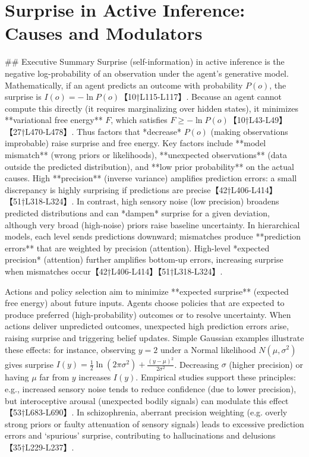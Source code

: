 \documentclass[a4paper]{article}
\title{}
\date{}
\begin{document}
    \maketitle

   
    \section{Surprise in Active Inference: Causes and Modulators }

    ## Executive Summary
    Surprise (self-information) in active inference is the negative log-probability of an observation under the agent’s generative model.  Mathematically, if an agent predicts an outcome with probability \(P(o)\), the surprise is \(I(o) = -\ln P(o)\)【10†L115-L117】.  Because an agent cannot compute this directly (it requires marginalizing over hidden states), it minimizes **variational free energy** \(F\), which satisfies \(F \ge -\ln P(o)\)【10†L43-L49】【27†L470-L478】.  Thus factors that *decrease* \(P(o)\) (making observations improbable) raise surprise and free energy.  Key factors include **model mismatch** (wrong priors or likelihoods), **unexpected observations** (data outside the predicted distribution), and **low prior probability** on the actual causes.  High **precision** (inverse variance) amplifies prediction errors: a small discrepancy is highly surprising if predictions are precise【42†L406-L414】【51†L318-L324】.  In contrast, high sensory noise (low precision) broadens predicted distributions and can *dampen* surprise for a given deviation, although very broad (high-noise) priors raise baseline uncertainty.  In hierarchical models, each level sends predictions downward; mismatches produce **prediction errors** that are weighted by precision (attention).  High-level *expected precision* (attention) further amplifies bottom-up errors, increasing surprise when mismatches occur【42†L406-L414】【51†L318-L324】.
    
    Actions and policy selection aim to minimize **expected surprise** (expected free energy) about future inputs.  Agents choose policies that are expected to produce preferred (high-probability) outcomes or to resolve uncertainty. When actions deliver unpredicted outcomes, unexpected high prediction errors arise, raising surprise and triggering belief updates.  Simple Gaussian examples illustrate these effects: for instance, observing \(y=2\) under a Normal likelihood \(N(\mu,\sigma^2)\) gives surprise \(I(y) = \frac12\ln(2\pi\sigma^2) + \frac{(y-\mu)^2}{2\sigma^2}\).  Decreasing \(\sigma\) (higher precision) or having \(\mu\) far from \(y\) increases \(I(y)\).  Empirical studies support these principles: e.g., increased sensory noise tends to reduce confidence (due to lower precision), but interoceptive arousal (unexpected bodily signals) can modulate this effect【53†L683-L690】.  In schizophrenia, aberrant precision weighting (e.g. overly strong priors or faulty attenuation of sensory signals) leads to excessive prediction errors and ‘spurious’ surprise, contributing to hallucinations and delusions【35†L229-L237】.
    
\end{document}
